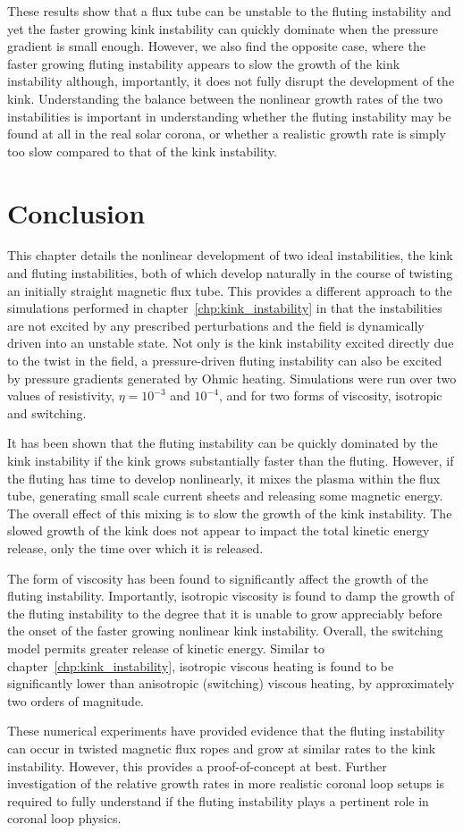 These results show that a flux tube can be unstable to the fluting instability and yet the faster growing kink instability can quickly dominate when the pressure gradient is small enough. However, we also find the opposite case, where the faster growing fluting instability appears to slow the growth of the kink instability although, importantly, it does not fully disrupt the development of the kink. Understanding the balance between the nonlinear growth rates of the two instabilities is important in understanding whether the fluting instability may be found at all in the real solar corona, or whether a realistic growth rate is simply too slow compared to that of the kink instability.

\section{Conclusion}

This chapter details the nonlinear development of two ideal instabilities, the kink and fluting instabilities, both of which develop naturally in the course of twisting an initially straight magnetic flux tube. This provides a different approach to the simulations performed in chapter~\ref{chp:kink_instability} in that the instabilities are not excited by any prescribed perturbations and the field is dynamically driven into an unstable state. Not only is the kink instability excited directly due to the twist in the field, a pressure-driven fluting instability can also be excited by pressure gradients generated by Ohmic heating. Simulations were run over two values of resistivity, $\eta=10^{-3}$ and $10^{-4}$, and for two forms of viscosity, isotropic and switching.

It has been shown that the fluting instability can be quickly dominated by the kink instability if the kink grows substantially faster than the fluting. However, if the fluting has time to develop nonlinearly, it mixes the plasma within the flux tube, generating small scale current sheets and releasing some magnetic energy. The overall effect of this mixing is to slow the growth of the kink instability. The slowed growth of the kink does not appear to impact the total kinetic energy release, only the time over which it is released. 

The form of viscosity has been found to significantly affect the growth of the fluting instability. Importantly, isotropic viscosity is found to damp the growth of the fluting instability to the degree that it is unable to grow appreciably before the onset of the faster growing nonlinear kink instability. Overall, the switching model permits greater release of kinetic energy. Similar to chapter~\ref{chp:kink_instability}, isotropic viscous heating is found to be significantly lower than anisotropic (switching) viscous heating, by approximately two orders of magnitude. 

These numerical experiments have provided evidence that the fluting instability can occur in twisted magnetic flux ropes and grow at similar rates to the kink instability. However, this provides a proof-of-concept at best. Further investigation of the relative growth rates in more realistic coronal loop setups is required to fully understand if the fluting instability plays a pertinent role in coronal loop physics.

